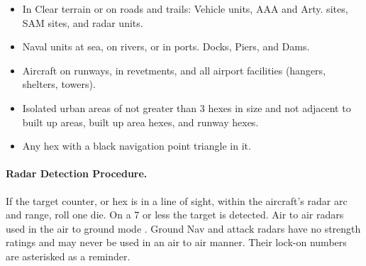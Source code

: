 \begin{advancedrules}
{\begin{itemize}
    \item In Clear terrain or on roads and trails: Vehicle units, AAA and Arty. sites, SAM sites, and radar units.

    \item Naval units at sea, on rivers, or in ports. Docks, Piers, and Dams.

    \item Aircraft on runways, in revetments, and all airport facilities (hangers, shelters, towers).

    \item Isolated urban areas of not greater than 3 hexes in size and not adjacent to built up areas, built up area hexes, and runway hexes.
    
    \item Any hex with a black navigation point triangle in it.

\end{itemize}

\paragraph{Radar Detection Procedure.} If the target counter, or hex is in a line of sight, within the aircraft's radar arc and  range, roll one die. On a 7 or less the target is detected. Air to air radars used in the air to ground mode . Ground Nav and attack radars have no strength ratings and may never be used in an air to air manner. Their lock-on numbers are asterisked as a reminder.


}
\end{advancedrules}
